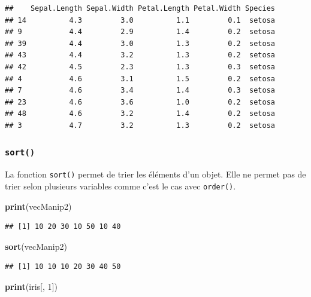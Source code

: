\documentclass[]{book}
\newenvironment{Shaded}{\begin{snugshade}}{\end{snugshade}}
\newcommand{\DecValTok}[1]{\textcolor[rgb]{0.00,0.00,0.81}{#1}}
\newcommand{\KeywordTok}[1]{\textcolor[rgb]{0.13,0.29,0.53}{\textbf{#1}}}
\newcommand{\NormalTok}[1]{#1}
\begin{document}
\begin{verbatim}
##    Sepal.Length Sepal.Width Petal.Length Petal.Width Species
## 14          4.3         3.0          1.1         0.1  setosa
## 9           4.4         2.9          1.4         0.2  setosa
## 39          4.4         3.0          1.3         0.2  setosa
## 43          4.4         3.2          1.3         0.2  setosa
## 42          4.5         2.3          1.3         0.3  setosa
## 4           4.6         3.1          1.5         0.2  setosa
## 7           4.6         3.4          1.4         0.3  setosa
## 23          4.6         3.6          1.0         0.2  setosa
## 48          4.6         3.2          1.4         0.2  setosa
## 3           4.7         3.2          1.3         0.2  setosa
\end{verbatim}

\hypertarget{l015sort}{%
\subsubsection{\texorpdfstring{\texttt{sort()}}{sort()}}\label{l015sort}}

La fonction \texttt{sort()} permet de trier les éléments d'un objet. Elle ne permet pas de trier selon plusieurs variables comme c'est le cas avec \texttt{order()}.

\begin{Shaded}
\begin{Highlighting}[]
\KeywordTok{print}\NormalTok{(vecManip2)}
\end{Highlighting}
\end{Shaded}

\begin{verbatim}
## [1] 10 20 30 10 50 10 40
\end{verbatim}

\begin{Shaded}
\begin{Highlighting}[]
\KeywordTok{sort}\NormalTok{(vecManip2)}
\end{Highlighting}
\end{Shaded}

\begin{verbatim}
## [1] 10 10 10 20 30 40 50
\end{verbatim}

\begin{Shaded}
\begin{Highlighting}[]
\KeywordTok{print}\NormalTok{(iris[, }\DecValTok{1}\NormalTok{])}
\end{Highlighting}
\end{Shaded}
\end{document}
